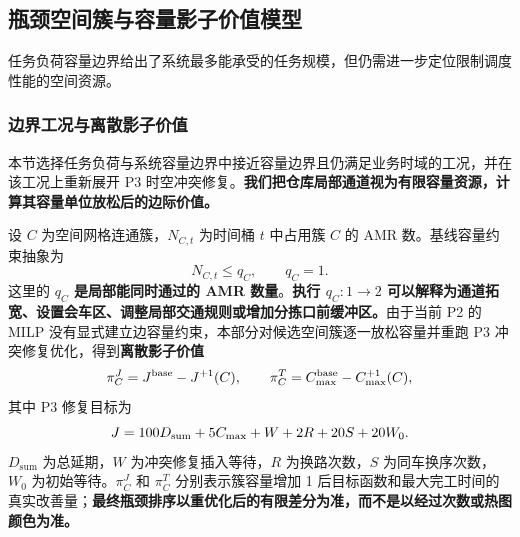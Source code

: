 \subsection{瓶颈空间簇与容量影子价值模型}

任务负荷容量边界给出了系统最多能承受的任务规模，但仍需进一步定位限制调度性能的空间资源。

\subsubsection{边界工况与离散影子价值}

本节选择任务负荷与系统容量边界中接近容量边界且仍满足业务时域的工况，并在该工况上重新展开 P3 时空冲突修复。\textbf{我们把仓库局部通道视为有限容量资源，计算其容量单位放松后的边际价值。}

设 $C$ 为空间网格连通簇，$N_{C,t}$ 为时间桶 $t$ 中占用簇 $C$ 的 AMR 数。基线容量约束抽象为
\begin{equation}
N_{C,t}\leq q_C,\qquad q_C=1.
\end{equation}
这里的 \textbf{$q_C$ 是局部能同时通过的 AMR 数量}。\textbf{执行 $q_C:1\rightarrow 2$ 可以解释为通道拓宽、设置会车区、调整局部交通规则或增加分拣口前缓冲区。}由于当前 P2 的 MILP 没有显式建立边容量约束，本部分对候选空间簇逐一放松容量并重跑 P3 冲突修复优化，得到\textbf{离散影子价值}
\begin{equation}
\pi_C^{J}=J^{\mathrm{base}}-J^{+1}(C),\qquad
\pi_C^{T}=C_{\max}^{\mathrm{base}}-C_{\max}^{+1}(C),
\end{equation}
其中 P3 修复目标为
\begin{equation}
J=100D_{\mathrm{sum}}+5C_{\max}+W+2R+20S+20W_0.
\end{equation}
$D_{\mathrm{sum}}$ 为总延期，$W$ 为冲突修复插入等待，$R$ 为换路次数，$S$ 为同车换序次数，$W_0$ 为初始等待。$\pi_C^J$ 和 $\pi_C^T$ 分别表示簇容量增加 1 后目标函数和最大完工时间的真实改善量；\textbf{最终瓶颈排序以重优化后的有限差分为准，而不是以经过次数或热图颜色为准。}

